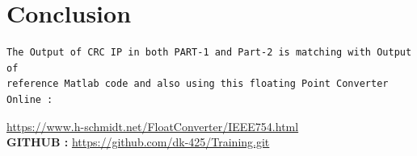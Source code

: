 \documentclass{article}
\begin{document}
\section{Conclusion}
\begin{lstlisting}
The Output of CRC IP in both PART-1 and Part-2 is matching with Output of 
reference Matlab code and also using this floating Point Converter Online :

\end{lstlisting}
\url{https://www.h-schmidt.net/FloatConverter/IEEE754.html}
\vspace{2cm}
\\
\textbf{GITHUB :} \url{https://github.com/dk-425/Training.git}
\end{document}
